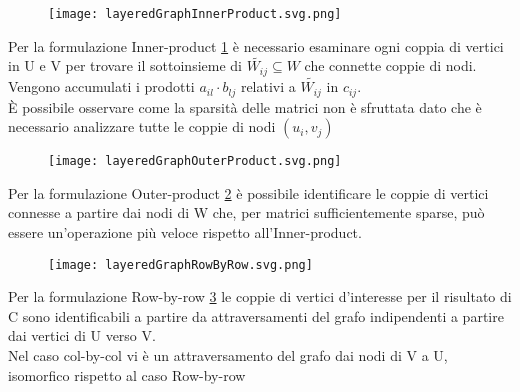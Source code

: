 \begin{figure}[h!]
  \centering \texttt{[image: layeredGraphInnerProduct.svg.png]} 
  \caption[Rappresentazione grafica del calcolo di $c_{i,j}$ mediante Inner-product]
  \decoRule \label{fig:layeredGraphInnerProduct}
\end{figure}
Per la formulazione Inner-product \ref{fig:layeredGraphInnerProduct} 
è necessario esaminare ogni coppia di vertici  in U e V per trovare 
il sottoinsieme di $\tilde{W_{ij}} \subseteq W$ che connette coppie di nodi. \\
Vengono accumulati i prodotti $a_{il} \cdot b_{lj}$ relativi a $\tilde{W_{ij}}$ in $c_{ij}$.\\
È possibile osservare come la sparsità delle matrici non è sfruttata dato
che è necessario analizzare tutte le coppie di nodi $(u_i,v_j)$\\
\begin{figure}[h!]
  \centering \texttt{[image: layeredGraphOuterProduct.svg.png]} 
  \caption[Rappresentazione grafica della componente $a_{*i} \cdot b_{i*}$ del calcolo di C mediante Outer-product]
  \decoRule \label{fig:layeredGraphOuterProduct}
\end{figure}
Per la formulazione Outer-product \ref{fig:layeredGraphOuterProduct}
è possibile identificare le coppie di vertici connesse a
partire dai nodi di W che, per matrici sufficientemente sparse,
può essere un'operazione più veloce rispetto all'Inner-product.\\
\begin{figure}[h!]
  \centering \texttt{[image: layeredGraphRowByRow.svg.png]} 
  \caption[Rappresentazione grafica della componente $a_{i*} \cdot B$ del 
     calcolo di C mediante formulazione row-by-row]
  \decoRule \label{fig:layeredGraphRowByRow}
  
\end{figure}
Per la formulazione Row-by-row \ref{fig:layeredGraphRowByRow}
le coppie di vertici d'interesse per il risultato di C sono identificabili 
a partire da attraversamenti del grafo indipendenti a partire dai vertici di U verso V.\\
Nel caso col-by-col vi è un attraversamento del grafo dai nodi di V a U, 
isomorfico rispetto al caso Row-by-row\\


